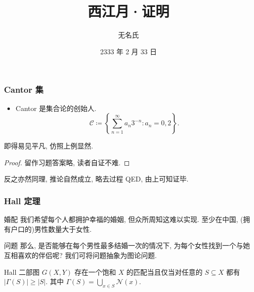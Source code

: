 \documentclass[notheorems, noamsthm, aspectratio=169, 12pt]{beamer}
\title{西江月·证明}
\author{无名氏}
\institute{加里敦大学}
\date{2333 年 2 月 33 日}
\begin{document}
    \maketitle
    \begin{frame}
        \frametitle{Cantor 集}
        \begin{itemize}
            \item Cantor 是集合论的创始人.
            \[ \mathscr C \coloneqq \left\{\sum_{n=1}^\infty a_n3^{-n}:a_n=0, 2 \right\}. \]
        \end{itemize}
        \begin{theorem}[沃·兹基硕德, 2022]
            即得易见平凡, 仿照上例显然.
        \end{theorem}
        \begin{proof}
            留作习题答案略, 读者自证不难.
        \end{proof}
        \begin{example}
            反之亦然同理, 推论自然成立, 略去过程 QED, 由上可知证毕.
        \end{example}
    \end{frame}

    \begin{frame}
        \frametitle{Hall 定理}
        \begin{block}{婚配}
            我们希望每个人都拥护幸福的婚姻, 但众所周知这难以实现. 至少在中国, (拥有户口的)男性数量大于女性.
        \end{block}
        \begin{alertblock}{问题}
            那么, 是否能够在每个男性最多结婚一次的情况下, 为每个女性找到一个与她互相喜欢的伴侣呢? 我们可将问题抽象为图论问题.
        \end{alertblock}
        \begin{exampleblock}{Hall}
            二部图 $G(X, Y)$ 存在一个饱和 $X$ 的匹配当且仅当对任意的 $S \subseteq X$ 都有 $|\Gamma(S)| \geq |S|$. 其中 $\Gamma(S) = \bigcup_{x \in S} \mathcal N(x)$.
        \end{exampleblock}
    \end{frame}        
\end{document}
